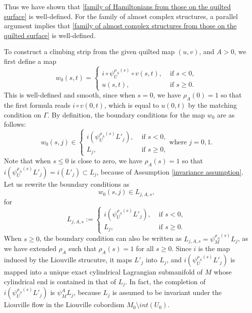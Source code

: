 \documentclass{amsart}
\numberwithin{equation}{section}
\numberwithin{figure}{section}
\begin{document}
Thus we have shown that \eqref{family of Hamiltonians from those on the quilted surface} is well-defined. For the family of almost complex structures, a parallel argument implies that \eqref{family of almost complex structures from those on the quilted surface} is well-defined. \par
	To construct a climbing strip from the given quilted map $(u, v)$, and $A > 0$, we first define a map
\begin{equation}
w_{0}(s, t)=
\begin{cases}
i \circ \psi_{U}^{\rho_{A}(s)} \circ v(s, t), &\text{ if } s < 0,\\
u(s, t), &\text{ if } s \ge 0.
\end{cases}
\end{equation}
This is well-defined and smooth, since when $s = 0$, we have $\rho_{A}(0) = 1$ so that the first formula reads $i \circ v(0, t)$, which is equal to $u(0, t)$ by the matching condition on $\Gamma$. By definition, the boundary conditions for the map $w_{0}$ are as follows:
\begin{equation}
w_{0}(s, j) \in
\begin{cases}
i(\psi_{U}^{\rho_{A}(s)} L'_{j}), & \text{ if } s < 0,\\
L_{j}, & \text{ if } s \ge 0,
\end{cases}
\text{where } j = 0, 1.
\end{equation}
Note that when $s \le 0$ is close to zero, we have $\rho_{A}(s) = 1$ so that $i(\psi_{U}^{\rho_{A}(s)} L'_{j}) = i(L'_{j}) \subset L_{j}$, because of Assumption \ref{invariance assumption}. Let us rewrite the boundary conditions as
\begin{equation*}
w_{0}(s, j) \in L_{j, A, s},
\end{equation*}
for
\begin{equation}\label{Lagrangian boundary conditions obtained from pasting a quilted map}
L_{j, A, s} :=
\begin{cases}
i(\psi_{U}^{\rho_{A}(s)} L'_{j}), & \text{ if } s < 0,\\
L_{j}, & \text{ if } s \ge 0.
\end{cases}
\end{equation}
When $s \ge 0$, the boundary condition can also be written as $L_{j, A, s} = \psi_{M}^{\rho_{A}(s)} L_{j}$, as we have extended $\rho_{A}$ such that $\rho_{A}(s) = 1$ for all $s \ge 0$.
Since $i$ is the map induced by the Liouville strucutre, it maps $L'_{j}$ into $L_{j}$, and $i(\psi_{U}^{\rho_{A}(s)} L'_{j})$ is mapped into a unique exact cylindrical Lagrangian submanifold of $M$ whose cylindrical end is contained in that of $L_{j}$. In fact, the completion of $i(\psi_{U}^{\rho_{A}(s)} L'_{j})$ is $\psi_{M}^{A} L_{j}$, because $L_{j}$ is assumed to be invariant under the Liouville flow in the Liouville cobordism $M_{0} \setminus int(U_{0})$.
\end{document}
